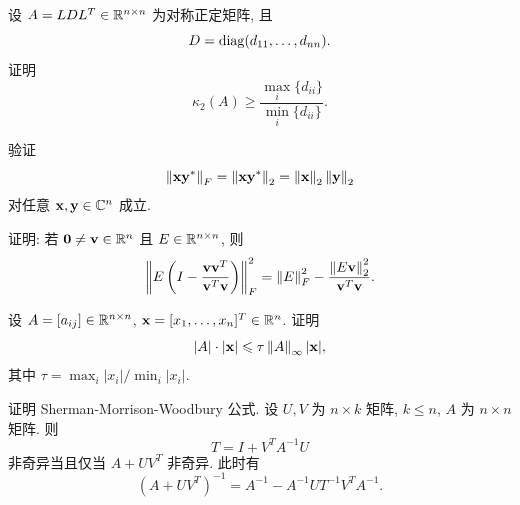 \begin{exercises}
  \item 设 $A=LDL^T\in\mathbb{R}^{n\times n}$ 为对称正定矩阵, 且
  \[
    D=\operatorname{diag}(d_{11},\ldots,d_{nn}).
  \]
  证明
  \[
    \kappa_2(A)\geqslant\frac{\max_i\{d_{ii}\}}{\min_i\{d_{ii}\}}.
  \]

  \item 验证
  \[
    \left\|\mathbf{x}\mathbf{y}^*\right\|_F=\left\|\mathbf{x}\mathbf{y}^*\right\|_2
    =\left\|\mathbf{x}\right\|_2\left\|\mathbf{y}\right\|_2
  \]
  对任意 $\mathbf{x},\mathbf{y}\in\mathbb{C}^n$ 成立.

  \item 证明: 若 $\mathbf{0}\neq\mathbf{v}\in\mathbb{R}^n$ 且 $E\in\mathbb{R}^{n\times n}$, 则
  \[
    \left\|E\left(I-\frac{\mathbf{v}\mathbf{v}^T}{\mathbf{v}^T\mathbf{v}}\right)\right\|_F^2
    =\left\|E\right\|_F^2-\frac{\left\|E\mathbf{v}\right\|_2^2}{\mathbf{v}^T\mathbf{v}}.
  \]

  \item 设 $A=[a_{ij}]\in\mathbb{R}^{n\times n}$, $\mathbf{x}=[x_1,\ldots,x_n]^T\in\mathbb{R}^n$. 证明
  \[
    |A|\cdot|\mathbf{x}|\leqslant\tau\left\|A\right\|_\infty|\mathbf{x}|,
  \]
  其中 $\tau=\max_i|x_i|/\min_i|x_i|$.

  \item 证明 Sherman-Morrison-Woodbury 公式. 设 $U,V$ 为 $n\times k$ 矩阵, $k\leqslant n$, $A$ 为 $n\times n$ 矩阵. 则
  \[
    T=I+V^TA^{-1}U
  \]
  非奇异当且仅当 $A+UV^T$ 非奇异. 此时有
  \[
    (A+UV^T)^{-1}=A^{-1}-A^{-1}UT^{-1}V^TA^{-1}.
  \]
\end{exercises}
